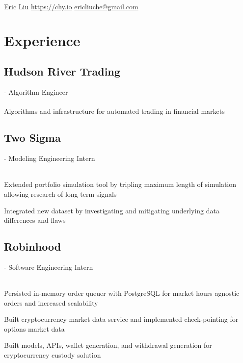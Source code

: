 \documentclass{resume}
\begin{document}
{Eric Liu}
{\href{https://chy.io}{https://chy.io}}
{\href{mailto:ericliuche@gmail.com}{ericliuche@gmail.com}}

\section{Experience}

\subsection{Hudson River Trading}- Algorithm Engineer \\
\\
\fontsize{11pt}{12pt}\selectfont
\hspace*{9.5mm}Algorithms and infrastructure for automated trading in financial markets

\subsection{Two Sigma}- Modeling Engineering Intern \\
\\
\fontsize{10.5pt}{12pt}
\begin{tightemize}
	\item Extended portfolio simulation tool by tripling maximum length of simulation allowing research of long term signals
	\item Integrated new dataset by investigating and mitigating underlying data differences and flaws
\end{tightemize}

\subsection{Robinhood}- Software Engineering Intern \\
\\
\begin{tightemize}
	\item Persisted in-memory order queuer with PostgreSQL for market hours agnostic orders and increased scalability
	\item Built cryptocurrency market data service and implemented check-pointing for options market data
	\item Built models, APIs, wallet generation, and withdrawal generation for cryptocurrency custody solution
\end{tightemize}
\end{document}
